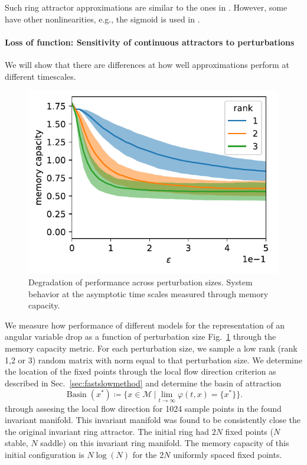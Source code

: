 \documentclass{article} %
\newcounter{ct}
\newcommand{\manifold}{\mathcal{M}}
\DeclareMathOperator{\basin}{Basin}
\theoremstyle{definition}
\theoremstyle{remark}
\begin{document}
 Such ring attractor approximations are similar to the ones in \citep{goodridge2000, samsonovich1997path, redish1996coupled, tsodyks1995associative}. %
However, some have other nonlinearities, e.g.,  the sigmoid is used in \citep{goodridge2000}.


\paragraph{Loss of function: Sensitivity of continuous attractors to perturbations}\label{sec:supp:boa}
We will show that there are differences at how well approximations perform at different timescales.

\begin{figure}[tbhp]
  \centering
  \includegraphics[width=\textwidth]{performance2}
  \caption{Degradation of performance across perturbation sizes. System behavior at the asymptotic time scales measured through memory capacity. }
  \label{fig:performance}
\end{figure}



We measure how performance of different models for the representation of an angular variable drop as a function of perturbation size Fig.~\ref{fig:performance} through the memory capacity metric.
For each perturbation size, we sample a low rank (rank 1,2 or 3) random matrix with norm equal to that perturbation size.
We determine the location of the fixed points through the local flow direction criterion as described in Sec.~\ref{sec:fastslowmethod}
and determine the basin of attraction
\begin{equation}
\basin(x^*) \coloneqq \{x\in \manifold \ | \lim_{t\rightarrow\infty}\varphi(t,x)=\{x^*\}\}.
\end{equation}
through assesing the local flow direction for 1024 sample points in the found invariant manifold.
This invariant manifold was found to be consistently close the the original invariant ring attractor.
The initial ring had \(2N\) fixed points (\(N\) stable, \(N\) saddle) on this invariant ring manifold.
The memory capacity of this initial configuration is \(N\log(N)\) for the \(2N\) uniformly spaced fixed points.
\end{document}
